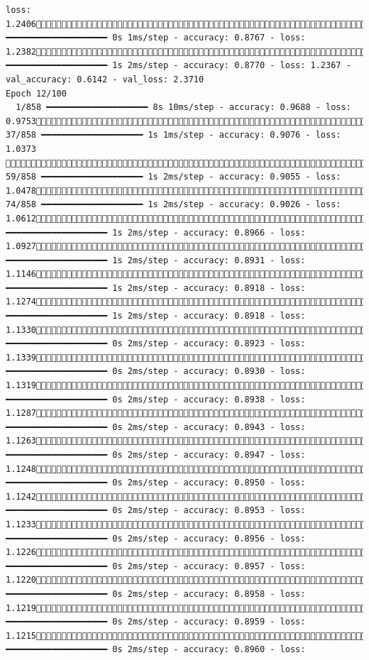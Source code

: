 \documentclass[
  letterpaper,
  DIV=11,
  numbers=noendperiod]{scrartcl}
\begin{document}
\begin{verbatim}
loss: 1.2406833/858 ━━━━━━━━━━━━━━━━━━━━ 0s 1ms/step - accuracy: 0.8767 - loss: 1.2382858/858 ━━━━━━━━━━━━━━━━━━━━ 1s 2ms/step - accuracy: 0.8770 - loss: 1.2367 - val_accuracy: 0.6142 - val_loss: 2.3710
Epoch 12/100
  1/858 ━━━━━━━━━━━━━━━━━━━━ 8s 10ms/step - accuracy: 0.9688 - loss: 0.9753 37/858 ━━━━━━━━━━━━━━━━━━━━ 1s 1ms/step - accuracy: 0.9076 - loss: 1.0373  59/858 ━━━━━━━━━━━━━━━━━━━━ 1s 2ms/step - accuracy: 0.9055 - loss: 1.0478 74/858 ━━━━━━━━━━━━━━━━━━━━ 1s 2ms/step - accuracy: 0.9026 - loss: 1.0612112/858 ━━━━━━━━━━━━━━━━━━━━ 1s 2ms/step - accuracy: 0.8966 - loss: 1.0927146/858 ━━━━━━━━━━━━━━━━━━━━ 1s 2ms/step - accuracy: 0.8931 - loss: 1.1146182/858 ━━━━━━━━━━━━━━━━━━━━ 1s 2ms/step - accuracy: 0.8918 - loss: 1.1274218/858 ━━━━━━━━━━━━━━━━━━━━ 1s 2ms/step - accuracy: 0.8918 - loss: 1.1330253/858 ━━━━━━━━━━━━━━━━━━━━ 0s 2ms/step - accuracy: 0.8923 - loss: 1.1339288/858 ━━━━━━━━━━━━━━━━━━━━ 0s 2ms/step - accuracy: 0.8930 - loss: 1.1319325/858 ━━━━━━━━━━━━━━━━━━━━ 0s 2ms/step - accuracy: 0.8938 - loss: 1.1287361/858 ━━━━━━━━━━━━━━━━━━━━ 0s 2ms/step - accuracy: 0.8943 - loss: 1.1263397/858 ━━━━━━━━━━━━━━━━━━━━ 0s 2ms/step - accuracy: 0.8947 - loss: 1.1248430/858 ━━━━━━━━━━━━━━━━━━━━ 0s 2ms/step - accuracy: 0.8950 - loss: 1.1242464/858 ━━━━━━━━━━━━━━━━━━━━ 0s 2ms/step - accuracy: 0.8953 - loss: 1.1233492/858 ━━━━━━━━━━━━━━━━━━━━ 0s 2ms/step - accuracy: 0.8956 - loss: 1.1226526/858 ━━━━━━━━━━━━━━━━━━━━ 0s 2ms/step - accuracy: 0.8957 - loss: 1.1220560/858 ━━━━━━━━━━━━━━━━━━━━ 0s 2ms/step - accuracy: 0.8958 - loss: 1.1219598/858 ━━━━━━━━━━━━━━━━━━━━ 0s 2ms/step - accuracy: 0.8959 - loss: 1.1215634/858 ━━━━━━━━━━━━━━━━━━━━ 0s 2ms/step - accuracy: 0.8960 - loss: 
\end{verbatim}
\end{document}
